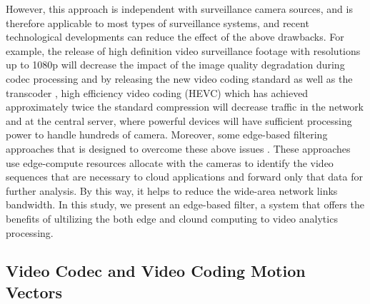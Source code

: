 However, this approach is independent with surveillance camera sources, and is therefore applicable to most types of surveillance systems, and recent technological developments can reduce the effect of the above drawbacks. For example, the release of high definition video surveillance footage with resolutions up to 1080p will decrease the impact of the image quality degradation during codec processing and by releasing the new video coding standard as well as the transcoder \cite{thanh2019efficient}, high efficiency video coding (HEVC)\cite{sullivan2012overview} which has achieved approximately twice the standard compression\cite{ohm2012comparison} will decrease traffic in the network and at the central server, where powerful devices will have sufficient processing power to handle hundreds of camera. Moreover, some edge-based filtering approaches that
is designed to overcome these above issues \cite{canel2019scaling}\cite{li2020reducto}\cite{chen2015glimpse}. These approaches use edge-compute resources allocate with the cameras to identify the video sequences that are necessary to cloud applications and forward only that data for further analysis. By this way, it helps to reduce the wide-area network links bandwidth. In this study, we present an edge-based filter, a system that offers the benefits of ultilizing the both edge  and clound computing to video analytics processing.
\subsection{Video Codec and Video Coding Motion Vectors}
